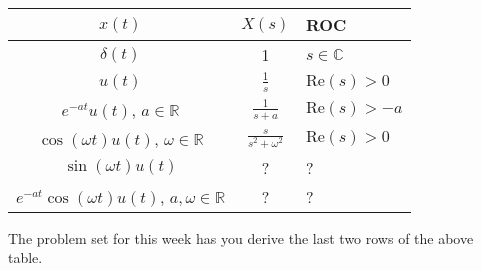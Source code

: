 \documentclass{article}
\begin{document}
\begin{tabular}{ccl}
  $x(t)$ & $X(s)$ & ROC \\
  \hline
  $\delta(t)$ & 1 & $s\in\mathbb{C}$\\
  $u(t)$ & $\frac{1}{s}$ & $\text{Re}(s) > 0$\\
  $e^{-at}u(t)$, $a\in\mathbb{R}$ & $\frac{1}{s+a}$ & $\text{Re}(s) > -a$\\
  $\cos(\omega t)u(t)$, $\omega\in\mathbb{R}$ & $\frac{s}{s^2 + \omega^2}$ & $\text{Re}(s) > 0$\\
  $\sin(\omega t)u(t)$ & ? & ?\\
  $e^{-at}\cos(\omega t)u(t)$, $a,\omega\in\mathbb{R}$ & ? & ?
\end{tabular}

The problem set for this week has you derive the last two rows of the above table.
\end{document}
